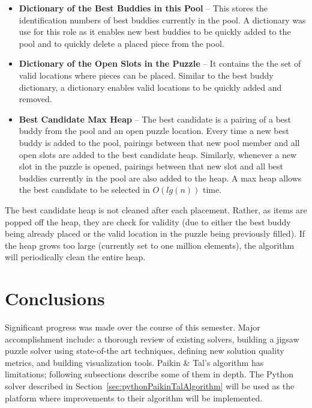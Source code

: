 \documentclass{report}
\begin{document}
\begin{itemize}

	\item \textbf{Dictionary of the Best Buddies in this Pool} -- This stores the identification numbers of best buddies currently in the pool.  A dictionary was use for this role as it enables new best buddies to be quickly added to the pool  and to quickly delete a placed piece from the pool.
	
	\item \textbf{Dictionary of the Open Slots in the Puzzle} -- It contains the the set of valid locations where pieces can be placed.  Similar to the best buddy dictionary, a dictionary enables valid locations to be quickly added and removed.

	\item \textbf{Best Candidate Max Heap} -- The best candidate is a pairing of a best buddy from the pool and an open puzzle location.  Every time a new best buddy is added to the pool, pairings between that new pool member and all open slots are added to the best candidate heap.  Similarly, whenever a new slot in the puzzle is opened, pairings between that new slot and all best buddies currently in the pool are also added to the heap.  A max heap allows the best candidate to be selected in $O(lg(n))$ time.
	
\end{itemize}

The best candidate heap is not cleaned after each placement.  Rather, as items are popped off the heap, they are check for validity (due to either the best buddy being already placed or the valid location in the puzzle being previously filled). If the heap grows too large (currently set to one million elements), the algorithm will periodically clean the entire heap.







\pagebreak
\section{Conclusions}\label{sec:conclusions}

Significant progress was made over the course of this semester.  Major accomplishment include: a thorough review of existing solvers, building a jigsaw puzzle solver using state-of-the art techniques, defining new solution quality metrics, and building visualization tools.  Paikin \& Tal's algorithm has limitations; following subsections describe some of them in depth.  The Python solver described in Section~\ref{sec:pythonPaikinTalAlgorithm} will be used as the platform where improvements to their algorithm will be implemented.
\end{document}
